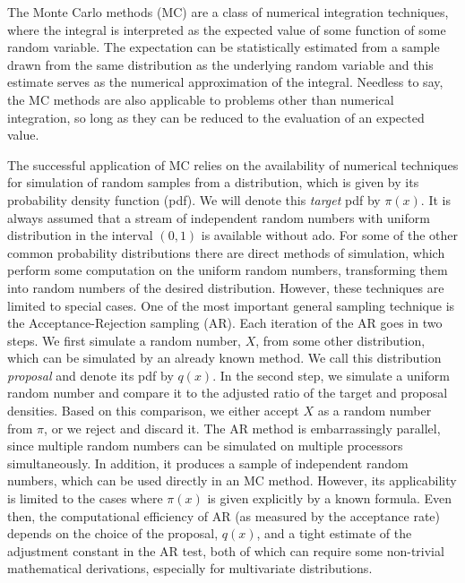 \documentclass[11pt,letterpaper]{article}       %
\begin{document}
The Monte Carlo methods (MC) are a class of numerical integration techniques,
where the integral is interpreted as the expected value of some function of
some random variable.  The expectation can be statistically estimated from a
sample drawn from the same distribution as the underlying random variable and
this estimate serves as the numerical approximation of the integral.  Needless
to say, the MC methods are also applicable to problems other than numerical
integration, so long as they can be reduced to the evaluation of an expected
value.  

The successful application of MC relies on the availability of numerical
techniques for simulation of random samples from a distribution, which is given
by its probability density function (pdf).  We will denote this \emph{target}
pdf by $\pi(x)$.  It is always assumed that a stream of independent random
numbers with uniform distribution in the interval $(0,1)$ is available without
ado.  For some of the other common probability distributions there are direct
methods of simulation, which perform some computation on the uniform random
numbers, transforming them into random numbers of the desired distribution.
However, these techniques are limited to special cases.  One of the most
important general sampling technique is the Acceptance-Rejection sampling (AR).
Each iteration of the AR goes in two steps.  We first simulate a random number,
$X$, from some other distribution, which can be simulated by an already known
method.  We call this distribution \emph{proposal} and denote its pdf by
$q(x)$.  In the second step, we simulate a uniform random number and compare it
to the adjusted ratio of the target and proposal densities.  Based on this
comparison, we either accept $X$ as a random number from $\pi$, or we reject
and discard it.  The AR method is embarrassingly parallel, since multiple
random numbers can be simulated on multiple processors simultaneously.  In
addition, it produces a sample of independent random numbers, which can be used
directly in an MC method.  However, its applicability is limited to the cases
where $\pi(x)$ is given explicitly by a known formula.  Even then, the
computational efficiency of AR (as measured by the acceptance rate) depends on
the choice of the proposal, $q(x)$, and a tight estimate of the adjustment
constant in the AR test, both of which can require some non-trivial
mathematical derivations, especially for multivariate distributions.  
\end{document}
